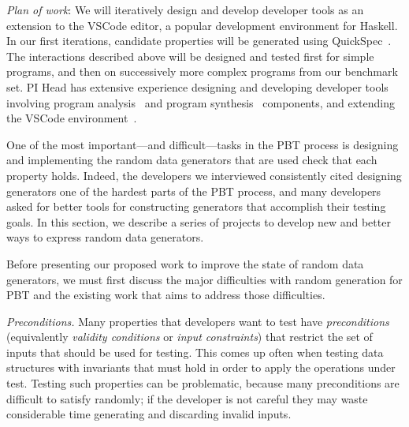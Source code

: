 \textit{Plan of work}: We will iteratively design and develop developer tools as
an extension to the VSCode editor, a popular development environment for
Haskell. In our first iterations, candidate properties will be generated using
QuickSpec~\cite{claessen2010quickspec}. The interactions described above will be
designed and tested first for simple programs, and then on successively more
complex programs from our benchmark set. PI Head has extensive experience
designing and developing developer tools involving program
analysis~\cite{head2018interactive,head2019managing} and program
synthesis~\cite{head2017writing} components, and extending the VSCode
environment~\cite{head2020composing}.   

\label{sec:gen}
One of the most important---and difficult---tasks in the PBT process is
designing and implementing the random data generators that are used check that
each property holds. Indeed, the developers we interviewed consistently
cited designing generators one of the hardest parts of the PBT process, and many
developers asked for better tools for constructing generators that accomplish
their testing goals. In this section, we describe a series of projects
to develop new and better ways to express random data generators.

%
Before presenting our proposed work to improve the state of random data
generators, we must first discuss the major difficulties with random generation
for PBT and the existing work that aims to address those difficulties.


{\em Preconditions.}
Many properties that developers want to test have {\em preconditions}
(equivalently {\em validity conditions} or {\em input constraints}) that
restrict the set of inputs that should be used for testing. This comes up often
when testing data structures with invariants that must hold in order to apply
the operations under test. Testing such properties can be problematic, because
many preconditions are difficult to satisfy randomly; if the developer is not
careful they may waste considerable time generating and discarding invalid inputs.

